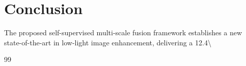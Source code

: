 \documentclass[11pt,a4paper]{article}
\begin{document}
\section{Conclusion}
The proposed self-supervised multi-scale fusion framework establishes a new state-of-the-art in low-light image enhancement, delivering a 12.4\textbackslash{}%


\begin{thebibliography}{99}
\end{thebibliography}
\end{document}

